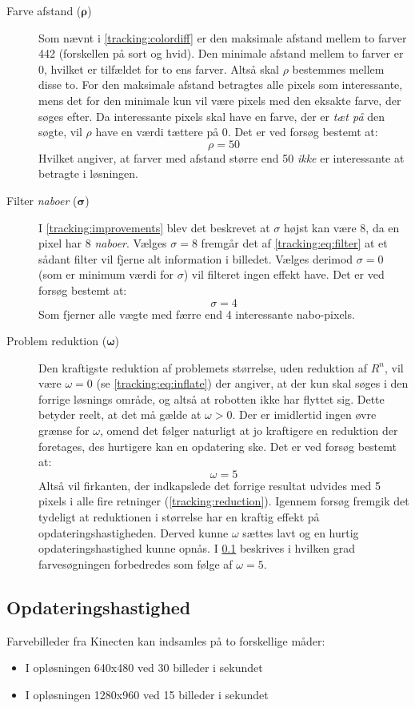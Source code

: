 \begin{description}
\item[Farve afstand (${\boldsymbol{\rho}}$)]
Som nævnt i \cref{tracking:colordiff} er den maksimale afstand mellem to farver 442 (forskellen på sort og hvid).
Den minimale afstand mellem to farver er 0, hvilket er tilfældet for to ens farver.
Altså skal $\rho$ bestemmes mellem disse to.
For den maksimale afstand betragtes alle pixels som interessante, mens det for den minimale kun vil være pixels med den eksakte farve, der søges efter.
Da interessante pixels skal have en farve, der er \emph{tæt på} den søgte, vil $\rho$ have en værdi tættere på 0.
Det er ved forsøg bestemt at:
$$\rho = 50$$
Hvilket angiver, at farver med afstand større end 50 \emph{ikke} er interessante at betragte i løsningen.

\item[Filter \textit{naboer} ($\boldsymbol{\sigma}$)]
I \cref{tracking:improvements} blev det beskrevet at $\sigma$ højst kan være 8, da en pixel har 8 \emph{naboer}.
Vælges $\sigma = 8$ fremgår det af \cref{tracking:eq:filter} at et sådant filter vil fjerne alt information i billedet.
Vælges derimod $\sigma = 0$ (som er minimum værdi for $\sigma$) vil filteret ingen effekt have.
Det er ved forsøg bestemt at:
$$\sigma = 4$$
Som fjerner alle vægte med færre end 4 interessante nabo-pixels.

\item[Problem reduktion ($\boldsymbol{\omega}$)]
Den kraftigste reduktion af problemets størrelse, uden reduktion af $R^n$, vil være $\omega = 0$ (se \cref{tracking:eq:inflate}) der angiver, at der kun skal søges i den forrige løsnings område, og altså at robotten ikke har flyttet sig.
Dette betyder reelt, at det må gælde at $\omega > 0$.
Der er imidlertid ingen øvre grænse for $\omega$, omend det følger naturligt at jo kraftigere en reduktion der foretages, des hurtigere kan en opdatering ske.
Det er ved forsøg bestemt at:
$$\omega = 5$$
Altså vil firkanten, der indkapslede det forrige resultat udvides med 5 pixels i alle fire retninger (\cref{tracking:reduction}).
Igennem forsøg fremgik det tydeligt at reduktionen i størrelse har en kraftig effekt på opdateringshastigheden.
Derved kunne $\omega$ sættes lavt og en hurtig opdateringshastighed kunne opnås.
I \cref{tracking:updatespeed} beskrives i hvilken grad farvesøgningen forbedredes som følge af $\omega = 5$.
\end{description}

\subsection{Opdateringshastighed}\label{tracking:updatespeed}
Farvebilleder fra Kinecten kan indsamles på to forskellige måder:
\begin{itemize}
\item I opløsningen 640x480 ved 30 billeder i sekundet
\item I opløsningen 1280x960 ved 15 billeder i sekundet
\end{itemize}


